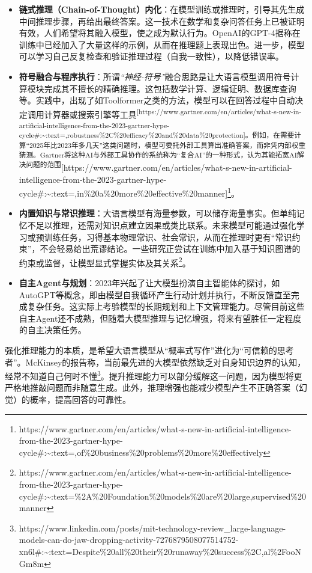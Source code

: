\documentclass[
  letterpaper,
]{scrbook}
\begin{document}
\begin{itemize}
\item
  \textbf{链式推理（Chain-of-Thought）内化}：在模型训练或推理时，引导其先生成中间推理步骤，再给出最终答案。这一技术在数学和复杂问答任务上已被证明有效，人们希望将其融入模型，使之成为默认行为。OpenAI的GPT-4据称在训练中已经加入了大量这样的示例，从而在推理题上表现出色。进一步，模型可以学习自己反复检查和验证推理过程（自我一致性），以降低错误率。
\item
  \textbf{符号融合与程序执行}：所谓\emph{``神经-符号''}融合思路是让大语言模型调用符号计算模块完成其不擅长的精确推理。这包括数学计算、逻辑证明、数据库查询等。实践中，出现了如Toolformer之类的方法，模型可以在回答过程中自动决定调用计算器或搜索引擎等工具\textsuperscript{{[}https://www.gartner.com/en/articles/what-s-new-in-artificial-intelligence-from-the-2023-gartner-hype-cycle\#:\textasciitilde:text=,robustness\%2C\%20efficacy\%20and\%20data\%20protection{]}。例如，在需要计算``2025年比2023年多几天''这类问题时，模型可委托外部工具算出准确答案，而非凭内部权重猜测。Gartner将这种AI与外部工具协作的系统称为``复合AI''的一种形式，认为其能拓宽AI解决问题的范围}{[}https://www.gartner.com/en/articles/what-s-new-in-artificial-intelligence-from-the-2023-gartner-hype-cycle\#:\textasciitilde:text=,in\%20a\%20more\%20effective\%20manner{]}\footnote{https://www.gartner.com/en/articles/what-s-new-in-artificial-intelligence-from-the-2023-gartner-hype-cycle\#:\textasciitilde:text=,of\%20business\%20problems\%20more\%20effectively}。
\item
  \textbf{内置知识与常识推理}：大语言模型有海量参数，可以储存海量事实。但单纯记忆不足以推理，还需对知识点建立因果或类比联系。未来模型可能通过强化学习或预训练任务，习得基本物理常识、社会常识，从而在推理时更有``常识约束''，不会轻易给出荒谬结论。一些研究正尝试在训练中加入基于知识图谱的约束或监督，让模型显式掌握实体及其关系\footnote{https://www.gartner.com/en/articles/what-s-new-in-artificial-intelligence-from-the-2023-gartner-hype-cycle\#:\textasciitilde:text=\%2A\%20Foundation\%20models\%20are\%20large,supervised\%20manner}。
\item
  \textbf{自主Agent与规划}：2023年兴起了让大模型扮演自主智能体的探讨，如AutoGPT等概念，即由模型自我循环产生行动计划并执行，不断反馈直至完成复杂任务。这实际上考验模型的长期规划和上下文管理能力。尽管目前这些自主Agent还不成熟，但随着大模型推理与记忆增强，将来有望胜任一定程度的自主决策任务。
\end{itemize}

强化推理能力的本质，是希望大语言模型从``概率式写作''进化为``可信赖的思考者''。McKinsey的报告称，当前最先进的大模型依然缺乏对自身知识边界的认知，经常不知道自己何时不懂\footnote{https://www.linkedin.com/posts/mit-technology-review\_large-language-models-can-do-jaw-dropping-activity-7276879508077514752-xn6l\#:\textasciitilde:text=Despite\%20all\%20their\%20runaway\%20success\%2C,al\%2FooNGm8m}。提升推理能力可以部分缓解这一问题，因为模型将更严格地推敲问题而非随意生成。此外，推理增强也能减少模型产生不正确答案（幻觉）的概率，提高回答的可靠性。
\end{document}
